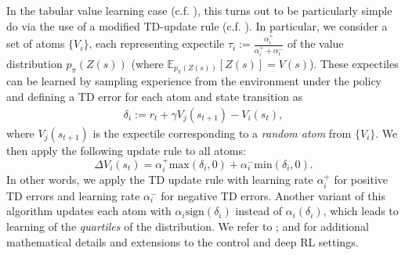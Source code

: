 In the tabular value learning case (c.f. ), this turns out to be particularly simple do via the use of a modified TD-update rule (c.f. ).
In particular, we consider a set of atoms $\{ V_i \}$, each representing expectile $\tau_i := \frac{\alpha_i^+}{\alpha_i^+ + \alpha_i^-}$ of the value distribution $p_\pi(Z(s))$ (where $\mathbb{E}_{ p_\pi(Z(s))} \left [ Z(s) \right ] = V(s)$).
These expectiles can be learned by sampling experience from the environment under the policy and defining a TD error for each atom and state transition as
\begin{align}
    \delta_i := r_t + \gamma V_j(s_{t+1}) - V_i(s_t),
\end{align}
where $V_j(s_{t+1})$ is the expectile corresponding to a \emph{random atom} from  $\{ V_i \}$.
We then apply the following update rule to all atoms:
\begin{equation}
    \label{eq:DRL_V_expec}
    \Delta V_i(s_t) = \alpha_i^+ \text{max}(\delta_i, 0 ) + \alpha_i^- \text{min}(\delta_i, 0).
\end{equation}
In other words, we apply the TD update rule with learning rate $\alpha_i^+$ for positive TD errors and learning rate $\alpha_i^-$ for negative TD errors.
Another variant of this algorithm updates each atom with $\alpha_i \text{sign}(\delta_i)$ instead of $\alpha_i (\delta_i)$, which leads to learning of the \emph{quartiles} of the distribution.
We refer to \citet{bellemare2017distributional,dabney2018distributional,rowland2019statistics,bellemare2023distributional}; and \citet{dabney2020distributional} for additional mathematical details and extensions to the control and deep RL settings.

